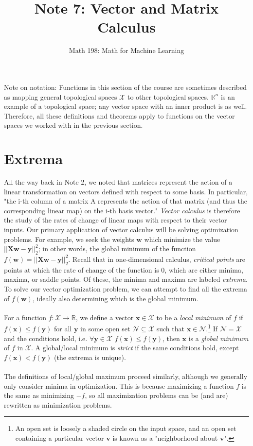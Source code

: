 \documentclass{article}
\title{Note 7: Vector and Matrix Calculus}
\author{Math 198: Math for Machine Learning}
\date{}
\begin{document}
\maketitle

\noindent Note on notation: Functions in this section of the course are sometimes described as mapping general topological spaces $\mathcal{X}$ to other topological spaces. $\mathbb{R}^n$ is an example of a topological space; any vector space with an inner product is as well. Therefore, all these definitions and theorems apply to functions on the vector spaces we worked with in the previous section.

\section{Extrema}
All the way back in Note 2, we noted that matrices represent the action of a linear transformation on vectors defined with respect to some basis. In particular, "the i-th column of a matrix A represents the action of that matrix (and thus the corresponding linear map) on the i-th basis vector." \textit{Vector calculus} is therefore the study of the rates of change of linear maps with respect to their vector inputs. Our primary application of vector calculus will be solving optimization problems. For example, we seek the weights $\mathbf{w}$ which minimize the value $\mathbf{||Xw - y}||_2^2$; in other words, the global minimum of the function $f(\mathbf{w}) = ||\mathbf{Xw - y}||_2^2$. Recall that in one-dimensional calculus, \textit{critical points} are points at which the rate of change of the function is 0, which are either minima, maxima, or saddle points. Of these, the minima and maxima are labeled \textit{extrema}. To solve our vector optimization problem, we can attempt to find all the extrema of $f(\mathbf{w})$, ideally also determining which is the global minimum. \\\\
For a function $f: \mathcal{X} \rightarrow \mathbb{R}$, we define a vector $\mathbf{x} \in \mathcal{X}$ to be a \textit{local minimum} of $f$ if $f(\mathbf{x}) \leq f(\mathbf{y})$ for all $\mathbf{y}$ in some open set $\mathcal{N} \subseteq \mathcal{X}$ such that $\mathbf{x} \in \mathcal{N}$.\footnote{An open set is loosely a shaded circle on the input space, and an open set containing a particular vector $\mathbf{v}$ is known as a "neighborhood about $\mathbf{v}$".} If $\mathcal{N} = \mathcal{X}$ and the conditions hold, i.e. $\forall \mathbf{y} \in \mathcal{X}$  $f(\mathbf{x}) \leq f(\mathbf{y})$, then $\mathbf{x}$ is a \textit{global minimum} of $f$ in $\mathcal{X}$. A global/local minimum is \textit{strict} if the same conditions hold, except $f(\mathbf{x}) < f(\mathbf{y})$ (the extrema is unique). \\\\
The definitions of local/global maximum proceed similarly, although we generally only consider minima in optimization. This is because maximizing a function $f$ is the same as minimizing $-f$, so all maximization problems can be (and are) rewritten as minimization problems.
\end{document}
